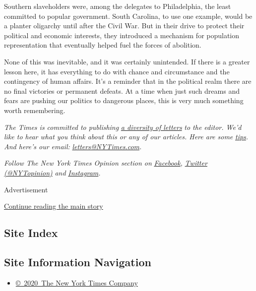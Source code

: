 Southern slaveholders were, among the delegates to Philadelphia, the
least committed to popular government. South Carolina, to use one
example, would be a planter oligarchy until after the Civil War. But in
their drive to protect their political and economic interests, they
introduced a mechanism for population representation that eventually
helped fuel the forces of abolition.

None of this was inevitable, and it was certainly unintended. If there
is a greater lesson here, it has everything to do with chance and
circumstance and the contingency of human affairs. It's a reminder that
in the political realm there are no final victories or permanent
defeats. At a time when just such dreams and fears are pushing our
politics to dangerous places, this is very much something worth
remembering.

\emph{The Times is committed to publishing}
\href{https://www.nytimes3xbfgragh.onion/2019/01/31/opinion/letters/letters-to-editor-new-york-times-women.html}{\emph{a
diversity of letters}} \emph{to the editor. We'd like to hear what you
think about this or any of our articles. Here are some}
\href{https://help.nytimes3xbfgragh.onion/hc/en-us/articles/115014925288-How-to-submit-a-letter-to-the-editor}{\emph{tips}}\emph{.
And here's our email:}
\href{mailto:letters@NYTimes.com}{\emph{letters@NYTimes.com}}\emph{.}

\emph{Follow The New York Times Opinion section on}
\href{https://www.facebookcorewwwi.onion/nytopinion}{\emph{Facebook}}\emph{,}
\href{http://twitter.com/NYTOpinion}{\emph{Twitter (@NYTopinion)}}
\emph{and}
\href{https://www.instagram.com/nytopinion/}{\emph{Instagram}}\emph{.}

Advertisement

\protect\hyperlink{after-bottom}{Continue reading the main story}

\hypertarget{site-index}{%
\subsection{Site Index}\label{site-index}}

\hypertarget{site-information-navigation}{%
\subsection{Site Information
Navigation}\label{site-information-navigation}}

\begin{itemize}
\tightlist
\item
  \href{https://help.nytimes3xbfgragh.onion/hc/en-us/articles/115014792127-Copyright-notice}{©~2020~The
  New York Times Company}
\end{itemize}

